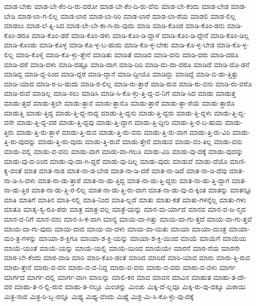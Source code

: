 {ಮಾಡ-ಬೇಕು
ಮಾಡ-ಬೇ-ಕೆಂ-ದಿ-ರು-ವರೋ
ಮಾಡ-ಬೇ-ಕೆಂ-ದಿ-ರು-ವೆನು
ಮಾಡ-ಬೇ-ಕೆಂದು
ಮಾಡ-ಬೇಡ
ಮಾಡ-ಬೇಡಿ
ಮಾಡ-ಲಾ-ಗ-ಲಿಲ್ಲ
ಮಾಡ-ಲಾರ
ಮಾಡ-ಲಾ-ರಿರಿ
ಮಾಡ-ಲಾರೆ
ಮಾಡ-ಲಾ-ರೆಯ
ಮಾಡಲಿ
ಮಾಡ-ಲಿಲ್ಲ
ಮಾಡಲು
ಮಾಡ-ಲೆ-ತ್ನಿ-ಸಿದ
ಮಾಡ-ಲೇ-ಬೇ-ಕಾ-ಗಿ-ರು-ವುದು
ಮಾಡಿ
ಮಾಡಿ-ಕೊಂಡ
ಮಾಡಿ-ಕೊಂ-ಡನು
ಮಾಡಿ-ಕೊಂ-ಡರೂ
ಮಾಡಿ-ಕೊಂ-ಡರೆ
ಮಾಡಿ-ಕೊಂ-ಡಳು
ಮಾಡಿ-ಕೊಂ-ಡಿ-ದ್ದಾಳೆ
ಮಾಡಿ-ಕೊಂ-ಡಿ-ದ್ದೇನೆ
ಮಾಡಿ-ಕೊಂ-ಡಿಲ್ಲ
ಮಾಡಿ-ಕೊಂಡು
ಮಾಡಿ-ಕೊಳ್ಳ
ಮಾಡಿ-ಕೊ-ಳ್ಳ-ಬ-ಹುದು
ಮಾಡಿ-ಕೊ-ಳ್ಳ-ಬೇಕು
ಮಾಡಿ-ಕೊ-ಳ್ಳ-ಬೇಡ
ಮಾಡಿ-ಕೊ-ಳ್ಳ-ಲಿಲ್ಲ
ಮಾಡಿ-ಕೊಳ್ಳಿ
ಮಾಡಿ-ಕೊ-ಳ್ಳು-ತ್ತೇನೆ
ಮಾಡಿತು
ಮಾಡಿತೆ
ಮಾಡಿದ
ಮಾಡಿ-ದನು
ಮಾಡಿ-ದರು
ಮಾಡಿ-ದರೂ
ಮಾಡಿ-ದರೆ
ಮಾಡಿ-ದಳು
ಮಾಡಿ-ದಷ್ಟೂ
ಮಾಡಿ-ದಾಗ
ಮಾಡಿ-ದಿರಿ
ಮಾಡಿ-ದು-ದಾ-ದರೂ
ಮಾಡಿದೆ
ಮಾಡಿ-ದೊ-ಡನೆ
ಮಾಡಿದ್ದ
ಮಾಡಿ-ದ್ದ-ರಿಂದ
ಮಾಡಿ-ದ್ದರೆ
ಮಾಡಿ-ದ್ದಾನೆ
ಮಾಡಿ-ದ್ದೀಯೊ
ಮಾಡಿದ್ದು
ಮಾಡಿದ್ದೆ
ಮಾಡಿ-ಬಿ-ಡು-ತ್ತಿತ್ತು
ಮಾಡಿ-ಯಾದ
ಮಾಡಿ-ರ-ಬ-ಹುದು
ಮಾಡಿ-ರ-ಲಿಲ್ಲ
ಮಾಡಿ-ರು-ತ್ತಾರೆ
ಮಾಡಿ-ರುವ
ಮಾಡಿ-ರು-ವನು
ಮಾಡಿ-ರು-ವರೊ
ಮಾಡಿ-ರುವೆ
ಮಾಡಿಲ್ಲ
ಮಾಡಿ-ಸಲು
ಮಾಡಿಸಿ
ಮಾಡಿ-ಸಿ-ಕೊ-ಳ್ಳು-ತ್ತಿ-ದ್ದ-ವ-ನಿಗೆ
ಮಾಡಿ-ಸಿದ
ಮಾಡು
ಮಾಡುತ್ತ
ಮಾಡು-ತ್ತದೆ
ಮಾಡು-ತ್ತಲೇ
ಮಾಡು-ತ್ತಾನೆ
ಮಾಡು-ತ್ತಾನೊ
ಮಾಡು-ತ್ತಾರೆ
ಮಾಡು-ತ್ತಾ-ರೆಯೆ
ಮಾಡು-ತ್ತಾರೊ
ಮಾಡುತ್ತಿ
ಮಾಡು-ತ್ತಿದ್ದ
ಮಾಡು-ತ್ತಿ-ದ್ದ-ನಾದ್ದ
ಮಾಡು-ತ್ತಿ-ದ್ದನು
ಮಾಡು-ತ್ತಿ-ದ್ದರು
ಮಾಡು-ತ್ತಿ-ದ್ದಳು
ಮಾಡು-ತ್ತಿ-ದ್ದ-ವನೇ
ಮಾಡು-ತ್ತಿ-ದ್ದ-ವರ
ಮಾಡು-ತ್ತಿ-ದ್ದವು
ಮಾಡು-ತ್ತಿ-ದ್ದಾಗ
ಮಾಡು-ತ್ತಿ-ದ್ದೀರಿ
ಮಾಡು-ತ್ತಿ-ರ-ಬ-ಹುದು
ಮಾಡು-ತ್ತಿರು
ಮಾಡು-ತ್ತಿ-ರು-ತ್ತಾಳೆ
ಮಾಡು-ತ್ತಿ-ರುವ
ಮಾಡು-ತ್ತಿ-ರು-ವನು
ಮಾಡು-ತ್ತಿ-ರು-ವಾಗ
ಮಾಡು-ತ್ತಿ-ರು-ವಿರಿ
ಮಾಡು-ತ್ತಿ-ರು-ವುದನ್ನು
ಮಾಡು-ತ್ತಿ-ರು-ವುದು
ಮಾಡು-ತ್ತಿ-ರುವೆ
ಮಾಡು-ತ್ತೇನೆ
ಮಾಡುವ
ಮಾಡು-ವಂ-ತಿಲ್ಲ
ಮಾಡು-ವನು
ಮಾಡು-ವಲ್ಲಿ
ಮಾಡು-ವ-ವನು
ಮಾಡು-ವಾಗ
ಮಾಡು-ವಾ-ಗಲೂ
ಮಾಡು-ವಿರಿ
ಮಾಡು-ವು-ದಕ್ಕೆ
ಮಾಡು-ವುದನ್ನು
ಮಾಡು-ವು-ದ-ರಿಂದ
ಮಾಡು-ವು-ದಾ-ಗಿ-ದ್ದರೆ
ಮಾಡು-ವು-ದಿಲ್ಲ
ಮಾಡು-ವುದು
ಮಾಡುವೆ
ಮಾಡು-ವೆಯೊ
ಮಾಣಿ-ಕ್ಯ-ದಂತೆ
ಮಾತ
ಮಾತ-ನಾಡ
ಮಾತ-ನಾ-ಡ-ಬೇಡ
ಮಾತ-ನಾ-ಡಿ-ದರೆ
ಮಾತ-ನಾ-ಡಿದೆ
ಮಾತ-ನಾ-ಡಿ-ದೆವು
ಮಾತ-ನಾ-ಡಿ-ಸಿ-ದಳು
ಮಾತ-ನಾ-ಡು-ತ್ತಾರೆ
ಮಾತ-ನಾ-ಡು-ತ್ತಿದ್ದ
ಮಾತ-ನಾ-ಡು-ತ್ತಿ-ದ್ದರು
ಮಾತ-ನಾ-ಡು-ತ್ತಿ-ದ್ದಾಗ
ಮಾತ-ನಾ-ಡು-ತ್ತಿರ
ಮಾತ-ನಾ-ಡು-ತ್ತಿ-ರ-ಲಿಲ್ಲ
ಮಾತ-ನಾ-ಡು-ತ್ತಿ-ರು-ವಾಗ
ಮಾತ-ನಾ-ಡು-ವು-ದ-ಕ್ಕಿಂತ
ಮಾತನ್ನು
ಮಾತನ್ನೂ
ಮಾತಿ
ಮಾತಿಗೆ
ಮಾತಿನ
ಮಾತಿ-ನಲ್ಲಿ
ಮಾತಿ-ನಿಂದ
ಮಾತಿ-ಲ್ಲದೆ
ಮಾತು
ಮಾತು-ಕತೆ
ಮಾತು-ಗಳನ್ನೆಲ್ಲ
ಮಾತು-ಗಳು
ಮಾತೂ
ಮಾತೃ-ಸ್ವ-ರೂ-ಪರು
ಮಾತ್ರ
ಮಾತ್ರ-ವಲ್ಲ
ಮಾತ್ರೆ-ಯನ್ನು
ಮಾನ-ಮ-ರ್ಯಾದೆ
ಮಾನವ
ಮಾನ-ವ-ಜ-ನ್ಮದ
ಮಾನ-ವ-ನಿಗೆ
ಮಾನ-ವನು
ಮಾನ-ಸಿ-ಕ-ವಾಗಿ
ಮಾನ್ಯ
ಮಾಯ-ವಾ-ಗಿತ್ತು
ಮಾಯ-ವಾ-ಗು-ತ್ತದೆ
ಮಾಯ-ವಾ-ಗು-ತ್ತವೆ
ಮಾಯ-ವಾ-ಗು-ವುದು
ಮಾಯ-ವಾದ
ಮಾಯ-ವಾ-ದಳು
ಮಾಯ-ವಾ-ಯಿತು
ಮಾಯಾ
ಮಾಯಾ-ಮಂತ್ರ
ಮಾಯಾ-ಮಂ-ತ್ರ-ಗಳನ್ನು
ಮಾಯಾ-ಶ-ಕ್ತಿಗೂ
ಮಾಯಾ-ಶ-ಕ್ತಿ-ಯನ್ನು
ಮಾಯಾ-ಶ-ಕ್ತಿ-ಯಿಂದ
ಮಾಯೆ
ಮಾಯೆಗೆ
ಮಾಯೆಯ
ಮಾಯೆ-ಯಂತೆ
ಮಾಯೆ-ಯನ್ನು
ಮಾಯೆ-ಯಲ್ಲಿ
ಮಾಯೆ-ಯಿಂದ
ಮಾಯೆಯೇ
ಮಾರನೆ
ಮಾರ-ನೆಯ
ಮಾರನೇ
ಮಾರ-ಬೇ-ಕೆಂದು
ಮಾರ-ವಾಡಿ
ಮಾರಿ
ಮಾರಿ-ಕೊಂ-ಡಂತೆ
ಮಾರಿದ
ಮಾರಿದೆ
ಮಾರಿ-ಯಾದ
ಮಾರು
ಮಾರು-ತ್ತಿ-ರುವ
ಮಾರು-ತ್ತೇನೆ
ಮಾರು-ವ-ವನ
ಮಾರು-ವ-ವ-ನಿದ್ದ
ಮಾರು-ವ-ವನು
ಮಾರು-ವ-ವರು
ಮಾರು-ವ-ವಳು
ಮಾರ್ಗ
ಮಾರ್ಗದ
ಮಾರ್ಗ-ದಲ್ಲಿ
ಮಾರ್ಗ-ವಾಗಿ
ಮಾಲನ್ನು
ಮಾಲಿ-ಕನ
ಮಾವ
ಮಾವನ
ಮಾವಿನ
ಮಾಹುತ
ಮಾಹು-ತ-ದೇ-ವರ
ಮಾಹು-ತ-ನ-ಲ್ಲಿ-ರುವ
ಮಾಹು-ತ-ನಲ್ಲೂ
ಮಿಂಚನ್ನು
ಮಿಂಚು
ಮಿಕ್ಕಿ-ದೆ-ಲ್ಲವೂ
ಮಿಕ್ಕಿ-ರು-ವು-ದಕ್ಕೂ
ಮಿಠಾಯಿ
ಮಿತ್ರ-ನಾದ
ಮಿತ್ರ-ರಿ-ಬ್ಬ-ರನ್ನೂ
ಮಿಥ್ಯ
ಮಿಥ್ಯ-ವೆಂದು
ಮಿಥ್ಯೆ
ಮಿಶ್ರ-ಮಿ-ಸಿ-ಕೊ-ಳ್ಳು-ವು-ದಕ್ಕೆ
}
